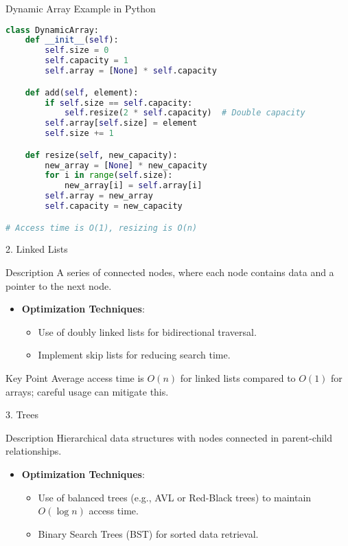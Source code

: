 \documentclass[aspectratio=169]{beamer}
\begin{document}
\begin{frame}[fragile]{Dynamic Array Example in Python}
  \begin{lstlisting}[language=Python]
class DynamicArray:
    def __init__(self):
        self.size = 0
        self.capacity = 1
        self.array = [None] * self.capacity

    def add(self, element):
        if self.size == self.capacity:
            self.resize(2 * self.capacity)  # Double capacity
        self.array[self.size] = element
        self.size += 1

    def resize(self, new_capacity):
        new_array = [None] * new_capacity
        for i in range(self.size):
            new_array[i] = self.array[i]
        self.array = new_array
        self.capacity = new_capacity

# Access time is O(1), resizing is O(n)
  \end{lstlisting}
\end{frame}

\begin{frame}{2. Linked Lists}
  \begin{block}{Description}
    A series of connected nodes, where each node contains data and a pointer to the next node.
  \end{block}
  \begin{itemize}
    \item \textbf{Optimization Techniques}:
      \begin{itemize}
        \item Use of doubly linked lists for bidirectional traversal.
        \item Implement skip lists for reducing search time.
      \end{itemize}
  \end{itemize}
  \begin{block}{Key Point}
    Average access time is \(O(n)\) for linked lists compared to \(O(1)\) for arrays; careful usage can mitigate this.
  \end{block}
\end{frame}

\begin{frame}{3. Trees}
  \begin{block}{Description}
    Hierarchical data structures with nodes connected in parent-child relationships.
  \end{block}
  \begin{itemize}
    \item \textbf{Optimization Techniques}:
      \begin{itemize}
        \item Use of balanced trees (e.g., AVL or Red-Black trees) to maintain \(O(\log n)\) access time.
        \item Binary Search Trees (BST) for sorted data retrieval.
      \end{itemize}
  \end{itemize}
\end{frame}
\end{document}
